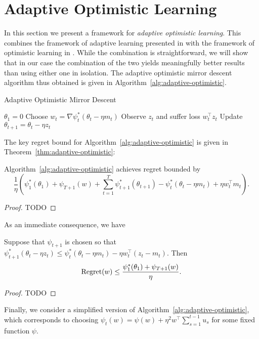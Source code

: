 \documentclass[paper_icml.tex]{subfiles}
\begin{document}
\section{Adaptive Optimistic Learning} 
\label{sec:machinery}
In this section we present a framework for \emph{adaptive optimistic learning}. 
This combines the framework of adaptive learning presented in \cite{orabona2013general} with 
the framework of optimistic learning in \cite{rakhlin2012}. While the combination is 
straightforward, we will show that in our case the combination of the two yields meaningfully 
better results than using either one in isolation. The adaptive optimistic mirror descent 
algorithm thus obtained is given in Algorithm~\ref{alg:adaptive-optimistic}.

\begin{algorithm}
\caption{Adaptive Optimistic Mirror Descent}
\label{alg:adaptive-optimistic}
\begin{algorithmic}
\STATE $\theta_1 = 0$
  \STATE Choose $w_t = \nabla \psi_t^*(\theta_t - \eta m_t)$
  \STATE Observe $z_t$ and suffer loss $w_t^{\top}z_t$
  \STATE Update $\theta_{t+1} = \theta_t - \eta z_t$
\ENDFOR
\end{algorithmic}
\end{algorithm}

The key regret bound for Algorithm~\ref{alg:adaptive-optimistic} is 
given in Theorem~\ref{thm:adaptive-optimistic}:
\begin{theorem}
Algorithm~\ref{alg:adaptive-optimistic} achieves regret bounded by
\begin{equation}
\frac{1}{\eta}\left(\psi_1^*(\theta_1) + \psi_{T+1}(w) + \sum_{t=1}^{T} \psi_{t+1}^*(\theta_{t+1}) - \psi_t^*(\theta_t - \eta m_t) + \eta w_t^{\top}m_t\right).
\end{equation}
\end{theorem}
\begin{proof}
TODO
\end{proof}
As an immediate consequence, we have
\begin{corollary}
\label{cor:a-o1}
Suppose that $\psi_{t+1}$ is chosen so that $\psi_{t+1}^*(\theta_t - \eta z_t) \leq \psi_t^*(\theta_t - \eta m_t) - \eta w_t^{\top}(z_t - m_t)$. Then
\begin{equation}
\operatorname{Regret}(w) \leq \frac{\psi_1^*(\theta_1) + \psi_{T+1}(w)}{\eta}.
\end{equation}
\end{corollary}
\begin{proof}
TODO
\end{proof}
Finally, we consider a simplified version of Algorithm~\ref{alg:adaptive-optimistic}, 
which corresponds to choosing $\psi_t(w) = \psi(w) + \eta^2 w^{\top} \sum_{s=1}^{t-1} u_s$ 
for some fixed function $\psi$.
\end{document}
